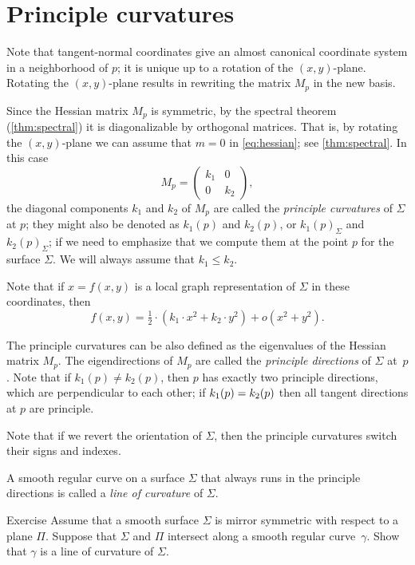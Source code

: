 \section{Principle curvatures}

Note that tangent-normal coordinates give an almost canonical coordinate system in a neighborhood of $p$;
it is unique up to a rotation of  the $(x,y)$-plane.
Rotating the $(x,y)$-plane results in rewriting   
the matrix $M_p$ in the new basis.

Since the Hessian matrix $M_p$ is symmetric, by the spectral theorem (\ref{thm:spectral}) it is diagonalizable by orthogonal matrices.
That is, by rotating the $(x,y)$-plane we can assume that $m=0$ in \ref{eq:hessian}; see \ref{thm:spectral}.
In this case
\[M_p=\begin{pmatrix}
   k_1
   &0
   \\
   0
   &k_2
  \end{pmatrix},
\]
the diagonal components $k_1$ and $k_2$ of $M_p$ are called the \emph{principle curvatures} of $\Sigma$ at $p$;
they might also be denoted as $k_1(p)$ and $k_2(p)$, or $k_1(p)_\Sigma$ and $k_2(p)_\Sigma$;
if we need to emphasize that we compute them at the point $p$ for the surface $\Sigma$.
We will always assume that $k_1\le k_2$.


Note that if $x=f(x,y)$ is a local graph representation of $\Sigma$ in these coordinates, then 
\[f(x,y)=\tfrac12\cdot(k_1\cdot x^2+k_2\cdot y^2)+o(x^2+y^2).\]

The principle curvatures can be also defined as the eigenvalues of the Hessian matrix $M_p$.
The eigendirections of $M_p$  are called the \emph{principle directions} of $\Sigma$ at~$p$.
Note that if $k_1(p)\ne k_2(p)$, then $p$ has exactly two principle directions, which are perpendicular to each other; if $k_1(p)\z= k_2(p)$ then all tangent directions at $p$ are principle.

Note that if we revert the orientation of $\Sigma$, then the principle curvatures switch their signs and indexes.

A smooth regular curve on a surface $\Sigma$ that always runs in the principle directions is called a \emph{line of curvature} of $\Sigma$.  

\begin{thm}{Exercise}\label{ex:line-of-curvature}
Assume that a smooth surface $\Sigma$ is mirror symmetric with respect to  a plane $\Pi$.
Suppose that $\Sigma$ and $\Pi$ intersect along a smooth regular curve~$\gamma$.
Show that $\gamma$ is a line of curvature of $\Sigma$.
\end{thm}

